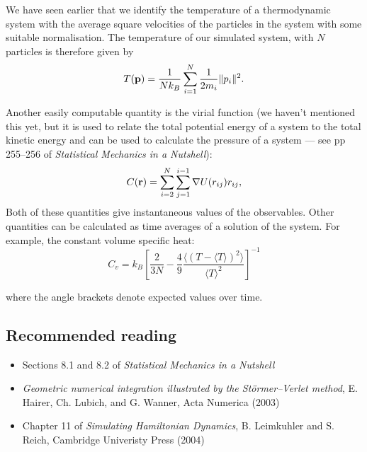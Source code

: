 We have seen earlier that we identify the temperature of a thermodynamic system with the average square velocities of the particles in the system with some suitable normalisation. The temperature of our simulated system, with $N$ particles is therefore given by
$$
	T({\bf p}) = \frac{1}{Nk_B}\sum_{i=1}^N\frac{1}{2m_i}\|p_i\|^2.
$$

Another easily computable quantity is the virial function (we haven't mentioned this yet, but it is used to relate the total potential energy of a system to the total kinetic energy and can be used to calculate the pressure of a system --- see pp 255--256 of \emph{Statistical Mechanics in a Nutshell}):
$$
	C({\bf r}) = \sum_{i=2}^N\sum_{j=1}^{i-1}\nabla U(r_{ij})r_{ij},
$$
Both of these quantities give instantaneous values of the observables. Other quantities can be calculated as time averages of a solution of the system. For example, the constant volume specific heat:
$$
	C_v = k_B\left[\frac{2}{3N}-\frac{4}{9}\frac{\langle(T-\langle T\rangle)^2\rangle}{\langle T\rangle^2}\right]^{-1}
$$

where the angle brackets denote expected values over time.

\subsection{Recommended reading}
\begin{itemize}
	\item Sections 8.1 and 8.2 of \emph{Statistical Mechanics in a Nutshell}
	\item \emph{Geometric numerical integration illustrated by the St\"{o}rmer–Verlet method}, E. Hairer, Ch. Lubich, and G. Wanner, Acta Numerica (2003)
	\item Chapter 11 of \emph{Simulating Hamiltonian Dynamics}, B. Leimkuhler and S. Reich, Cambridge Univeristy Press (2004)
\end{itemize}


